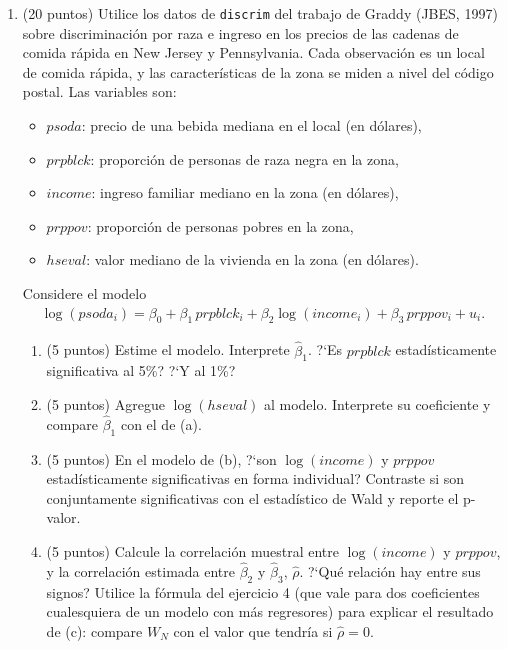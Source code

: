 \documentclass[letterpaper,11pt]{article}
\theoremstyle{plain}
\theoremstyle{definition}
\theoremstyle{remark}
\begin{document}
\begin{enumerate}
\item (20 puntos) Utilice los datos de \texttt{discrim} del trabajo de Graddy (JBES, 1997)
    sobre discriminaci\'on por raza e ingreso en los precios de las cadenas de comida r\'apida en
    New Jersey y Pennsylvania. Cada observaci\'on es un local de comida r\'apida, y las
    caracter\'isticas de la zona se miden a nivel del c\'odigo postal. Las variables son:
    \begin{itemize}
        \item $psoda$: precio de una bebida mediana en el local (en d\'olares),
        \item $prpblck$: proporci\'on de personas de raza negra en la zona,
        \item $income$: ingreso familiar mediano en la zona (en d\'olares),
        \item $prppov$: proporci\'on de personas pobres en la zona,
        \item $hseval$: valor mediano de la vivienda en la zona (en d\'olares).
    \end{itemize}
    Considere el modelo
    \begin{align*}
    \log(psoda_i)=\beta_0+\beta_1\, prpblck_i+\beta_2 \log(income_i) +\beta_3\, prppov_i +u_i.
    \end{align*}
    \begin{enumerate}
        \item (5 puntos) Estime el modelo. Interprete $\hat\beta_1$. ?`Es $prpblck$
            estad\'isticamente significativa al 5\%? ?`Y al 1\%?
        \item (5 puntos) Agregue $\log(hseval)$ al modelo. Interprete su coeficiente y
            compare $\hat\beta_1$ con el de (a).
        \item (5 puntos) En el modelo de (b), ?`son $\log(income)$ y $prppov$
            estad\'isticamente significativas en forma individual? Contraste si son
            conjuntamente significativas con el estad\'istico de Wald y reporte el p-valor.
        \item (5 puntos) Calcule la correlaci\'on muestral entre $\log(income)$ y $prppov$, y
            la correlaci\'on estimada entre $\hat\beta_2$ y $\hat\beta_3$, $\hat\rho$. ?`Qu\'e
            relaci\'on hay entre sus signos? Utilice la f\'ormula del ejercicio 4 (que vale para
            dos coeficientes cualesquiera de un modelo con m\'as regresores) para explicar el
            resultado de (c): compare $W_N$ con el valor que tendr\'ia si $\hat\rho=0$.
    \end{enumerate}

\end{enumerate}
\end{document}
